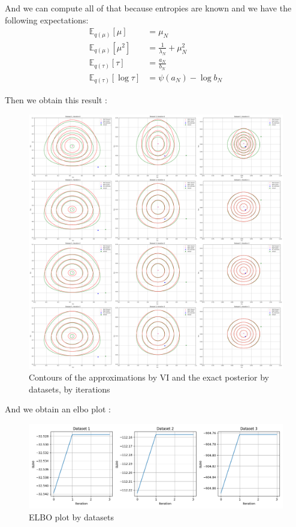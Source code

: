 \documentclass{article}
\begin{document}
And we can compute all of that because entropies are known and we have the following expectations:
\begin{equation}
    \begin{split}
        \mathbb{E}_{q(\mu)}[\mu]        & = \mu_N                         \\
        \mathbb{E}_{q(\mu)}[\mu^2]      & = \frac{1}{\lambda_N} + \mu_N^2 \\
        \mathbb{E}_{q(\tau)}[\tau]      & = \frac{a_N}{b_N}               \\
        \mathbb{E}_{q(\tau)}[\log \tau] & = \psi(a_N) - \log b_N
    \end{split}
\end{equation}

Then we obtain this result :
\begin{figure}[H]
    \centering
    \includegraphics[scale=0.2]{images/15_contours.png}
    \caption{Contours of the approximations by VI and the exact posterior by datasets, by iterations}
    \label{fig:3.15.1}
\end{figure}

And we obtain an elbo plot :
\begin{figure}[H]
    \centering
    \includegraphics[scale=0.5]{images/15_elbo.png}
    \caption{ELBO plot by datasets}
    \label{fig:3.15.2}
\end{figure}
\end{document}
